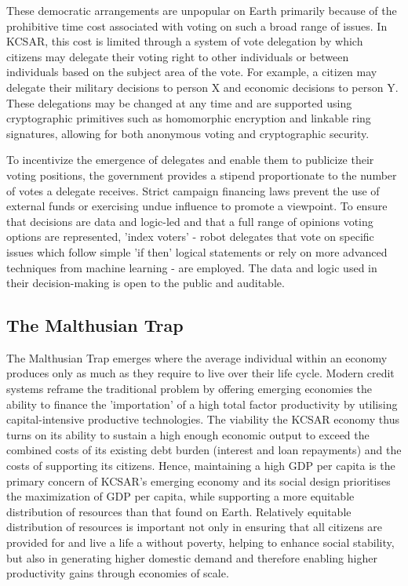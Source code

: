 \documentclass[fleqn,10pt]{Stylesheet} %
\begin{document}
These democratic arrangements are unpopular on Earth primarily because of the prohibitive time cost associated with voting on such a broad range of issues. In KCSAR, this cost is limited through a system of vote delegation by which citizens may delegate their voting right to other individuals or between individuals based on the subject area of the vote. For example, a citizen may delegate their military decisions to person X and economic decisions to person Y. These delegations may be changed at any time and are supported using cryptographic primitives such as homomorphic encryption and linkable ring signatures, allowing for both anonymous voting and cryptographic security.

To incentivize the emergence of delegates and enable them to publicize their voting positions, the government provides a stipend proportionate to the number of votes a delegate receives. Strict campaign financing laws prevent the use of external funds or exercising undue influence to promote a viewpoint. To ensure that decisions are data and logic-led and that a full range of opinions voting options are represented, 'index voters' - robot delegates that vote on specific issues which follow simple 'if then' logical statements or rely on more advanced techniques from machine learning - are employed. The data and logic used in their decision-making is open to the public and auditable.

\subsection{The Malthusian Trap}
The Malthusian Trap emerges where the average individual within an economy produces only as much as they require to live over their life cycle. Modern credit systems reframe the traditional problem by offering emerging economies the ability to finance the 'importation' of a high total factor productivity by utilising capital-intensive productive technologies. The viability the KCSAR economy thus turns on its ability to sustain a high enough economic output to exceed the combined costs of its existing debt burden (interest and loan repayments) and the costs of supporting its citizens. Hence, maintaining a high GDP per capita is the primary concern of KCSAR's emerging economy and its social design prioritises the maximization of GDP per capita, while supporting a more equitable distribution of resources than that found on Earth. Relatively equitable distribution of resources is important not only in ensuring that all citizens are provided for and live a life a without poverty, helping to enhance social stability, but also in generating higher domestic demand and therefore enabling higher productivity gains through economies of scale. \cite{Kogel&Prskawetz, 2000} 
\end{document}
